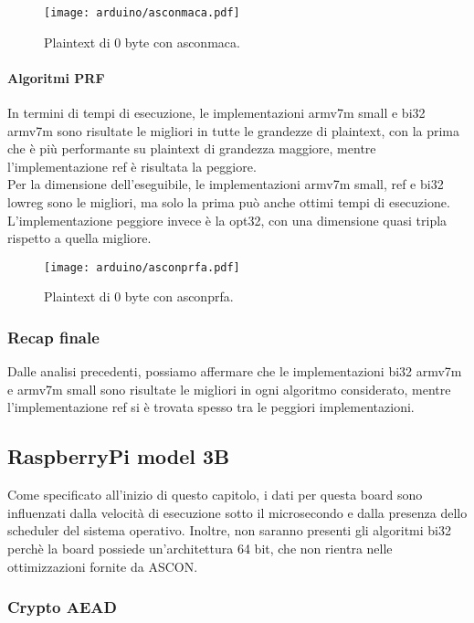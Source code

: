 \begin{figure}[H]
    \centering
    \texttt{[image: arduino/asconmaca.pdf]}
    \caption{Plaintext di 0 byte con asconmaca.}
\end{figure}

\paragraph{Algoritmi PRF}

In termini di tempi di esecuzione, le implementazioni armv7m small e bi32 armv7m sono risultate le migliori in tutte le grandezze di plaintext, con la prima che è più performante su plaintext di grandezza maggiore, mentre l'implementazione ref è risultata la peggiore. \\

\noindent Per la dimensione dell'eseguibile, le implementazioni armv7m small, ref e bi32 lowreg sono le migliori, ma solo la prima può  anche ottimi tempi di esecuzione. L'implementazione peggiore invece è la opt32, con una dimensione quasi tripla rispetto a quella migliore.

\begin{figure}[H]
    \centering
    \texttt{[image: arduino/asconprfa.pdf]}
    \caption{Plaintext di 0 byte con asconprfa.}
\end{figure}

\subsubsection{Recap finale}

Dalle analisi precedenti, possiamo affermare che le implementazioni bi32 armv7m e armv7m small sono risultate le migliori in ogni algoritmo considerato, mentre l'implementazione ref si è trovata spesso tra le peggiori implementazioni.

\subsection{RaspberryPi model 3B}

Come specificato all'inizio di questo capitolo, i dati per questa board sono influenzati dalla velocità di esecuzione sotto il microsecondo e dalla presenza dello scheduler del sistema operativo. Inoltre, non saranno presenti gli algoritmi bi32 perchè la board possiede un'architettura 64 bit, che non rientra nelle ottimizzazioni fornite da ASCON.

\subsubsection{Crypto AEAD}

